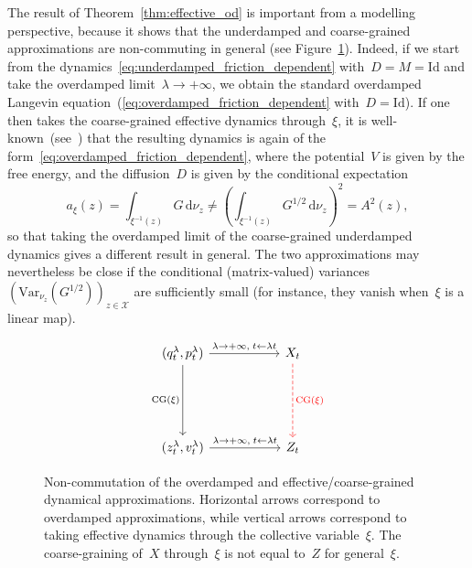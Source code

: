 \documentclass[10pt]{article}
\renewcommand{\d}{\mathrm{d}}
\newcommand{\cX}{\mathcal{X}}
\newcommand{\1}{\mathbbm 1}
\newcommand{\Id}{\mathrm{Id}}
\begin{document}
    The result of Theorem~\ref{thm:effective_od} is important from a modelling perspective, because it shows that the underdamped and coarse-grained approximations are non-commuting in general (see Figure~\ref{fig:non_commutativity}).
    Indeed, if we start from the dynamics~\eqref{eq:underdamped_friction_dependent} with~$D=M=\Id$ and take the overdamped limit~$\lambda\to +\infty$, we obtain the standard overdamped Langevin equation~(\eqref{eq:overdamped_friction_dependent} with~$D=\Id$). If one then takes the coarse-grained effective dynamics through~$\xi$, it is well-known~(see~\cite{LL10,ZHS16}) that the resulting dynamics is again of the form~\eqref{eq:overdamped_friction_dependent}, where the potential~$V$ is given by the free energy, and the diffusion~$D$ is given by the conditional expectation
    \begin{equation}
        a_\xi(z) = \int_{\xi^{-1}(z)}G\,\d\nu_z\neq \left(\int_{\xi^{-1}(z)} G^{1/2}\,\d\nu_z\right)^2 = A^2(z),
    \end{equation}
so that taking the overdamped limit of the coarse-grained underdamped dynamics gives a different result in general. The two approximations may nevertheless be close if the conditional (matrix-valued) variances~$\left({\mathrm{Var}}_{\nu_z}\left(G^{1/2}\right)\right)_{z\in\cX}$ are sufficiently small (for instance, they vanish when~$\xi$ is a linear map).

\begin{figure}
  \centering
  \[
    \begin{tikzcd}[row sep=5.5em, column sep=5.5em]
      (q_t^\lambda,p_t^\lambda)
        \arrow[r, "{\lambda\to +\infty,\; t\leftarrow \lambda t}"]
        \arrow[d, "{\text{CG}(\xi)}"']
      & X_t
        \arrow[d, dashed, red, "{\text{CG}(\xi)}"]
      \\
      (z_t^\lambda,v_t^\lambda)
        \arrow[r, "{\lambda\to +\infty,\; t\leftarrow \lambda t}"]
      & Z_t
    \end{tikzcd}
  \]
  \caption{Non-commutation of the overdamped and effective/coarse-grained dynamical approximations. Horizontal arrows correspond to overdamped approximations, while vertical arrows correspond to taking effective dynamics through the collective variable~$\xi$.
  The coarse-graining of~$X$ through~$\xi$ is not equal to~$Z$ for general~$\xi$.}
  \label{fig:non_commutativity}
\end{figure}
\end{document}
